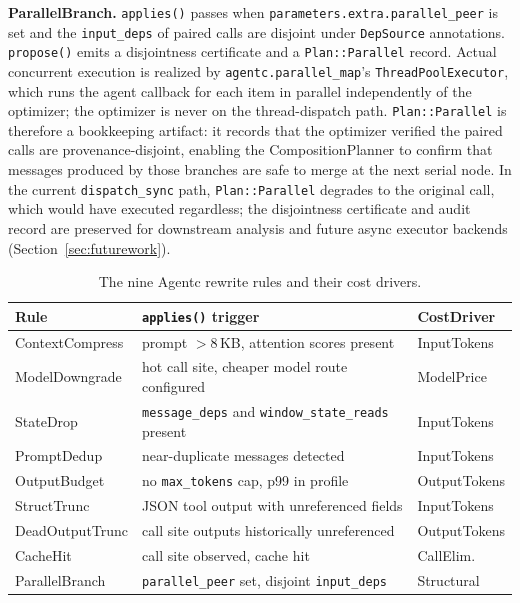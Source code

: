 \documentclass[sigconf,9pt]{acmart}
\begin{document}
\textbf{ParallelBranch.} \texttt{applies()} passes when
\texttt{parameters.extra.\allowbreak parallel\_peer} is set and the
\texttt{input\_deps} of paired calls are disjoint under \texttt{DepSource}
annotations. \texttt{propose()} emits a disjointness certificate and a
\texttt{Plan::Parallel} record. Actual concurrent execution is realized by
\texttt{agentc.parallel\_map}'s \texttt{ThreadPoolExecutor}, which runs the agent
callback for each item in parallel independently of the optimizer; the optimizer
is never on the thread-dispatch path. \texttt{Plan::Parallel} is therefore a
bookkeeping artifact: it records that the optimizer verified the paired calls are
provenance-disjoint, enabling the CompositionPlanner to confirm that messages
produced by those branches are safe to merge at the next serial node. In the
current \texttt{dispatch\_sync} path, \texttt{Plan::Parallel} degrades to the
original call, which would have executed regardless; the disjointness certificate
and audit record are preserved for downstream analysis and future async executor
backends (Section~\ref{sec:futurework}).

\begin{table}[t]
\caption{The nine Agentc rewrite rules and their cost drivers.}
\label{tab:rules}
\footnotesize
\begin{tabularx}{\columnwidth}{@{} l X l @{}}
\toprule
Rule & \texttt{applies()} trigger & CostDriver \\
\midrule
ContextCompress  & prompt $>$8\,KB, attention scores present       & InputTokens \\
ModelDowngrade   & hot call site, cheaper model route configured   & ModelPrice \\
StateDrop        & \texttt{message\_deps} and \texttt{window\_state\_reads} present & InputTokens \\
PromptDedup      & near-duplicate messages detected                & InputTokens \\
OutputBudget     & no \texttt{max\_tokens} cap, p99 in profile     & OutputTokens \\
StructTrunc      & JSON tool output with unreferenced fields       & InputTokens \\
DeadOutputTrunc  & call site outputs historically unreferenced     & OutputTokens \\
CacheHit         & call site observed, cache hit                   & CallElim. \\
ParallelBranch   & \texttt{parallel\_peer} set, disjoint \texttt{input\_deps} & Structural \\
\bottomrule
\end{tabularx}
\end{table}
\end{document}

